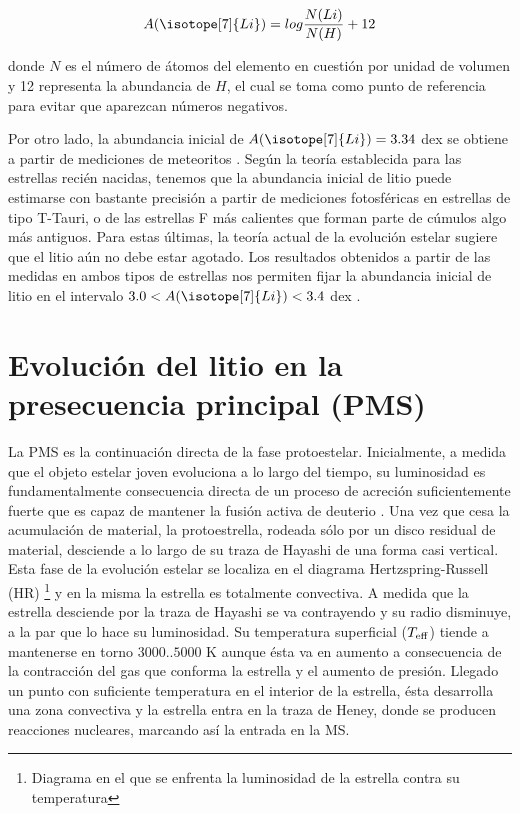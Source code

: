 \begin{ceqn}
	\begin{equation}
		A(\isotope[7]{Li}) = log\frac{N(Li)}{N(H)} + 12
		\label{eq:A_Li}
	\end{equation}
\end{ceqn}

donde $N$ es el número de átomos del elemento en cuestión por unidad de volumen y 12 representa la abundancia de $H$, el cual se toma como punto de referencia para evitar que aparezcan números negativos.\par

Por otro lado, la abundancia inicial de $A(\isotope[7]{Li}) = 3.34$ dex se obtiene a partir de mediciones de meteoritos \citep{Randich2006}. Según la teoría establecida para las estrellas recién nacidas, tenemos que la abundancia inicial de litio puede estimarse con bastante precisión a partir de mediciones fotosféricas en estrellas de tipo T-Tauri, o de las estrellas F más calientes que forman parte de cúmulos algo más antiguos. Para estas últimas, la teoría actual de la evolución estelar sugiere que el litio aún no debe estar agotado. Los resultados obtenidos a partir de las medidas en ambos tipos de estrellas nos permiten fijar la abundancia inicial de litio en el intervalo $3.0 < A(\isotope[7]{Li}) < 3.4$ dex \citep{Randich2006}.\par


\section{Evolución del litio en la presecuencia principal (PMS)}
La PMS es la continuación directa de la fase protoestelar. Inicialmente, a medida que el objeto estelar joven evoluciona a lo largo del tiempo, su luminosidad es fundamentalmente consecuencia directa de un proceso de acreción suficientemente fuerte que es capaz de mantener la fusión activa de deuterio \citep{Stahler1983}. Una vez que cesa la acumulación de material, la protoestrella, rodeada sólo por un disco residual de material, desciende a lo largo de su traza de Hayashi de una forma casi vertical. Esta fase de la evolución estelar se localiza en el diagrama Hertzspring-Russell (HR) \footnote{Diagrama en el que se enfrenta la luminosidad de la estrella contra su temperatura} y en la misma la estrella es totalmente convectiva. A medida que la estrella desciende por la traza de Hayashi se va contrayendo y su radio disminuye, a la par que lo hace su luminosidad. Su temperatura superficial ($T_{\mathrm{eff}}$) tiende a mantenerse  en torno $3000..5000$ K aunque ésta va en aumento a consecuencia de la contracción del gas que conforma la estrella y el aumento de presión. Llegado un punto con suficiente temperatura en el interior de la estrella, ésta desarrolla una zona convectiva y la estrella entra en la traza de Heney, donde se producen reacciones nucleares, marcando así la entrada en la MS. \par

